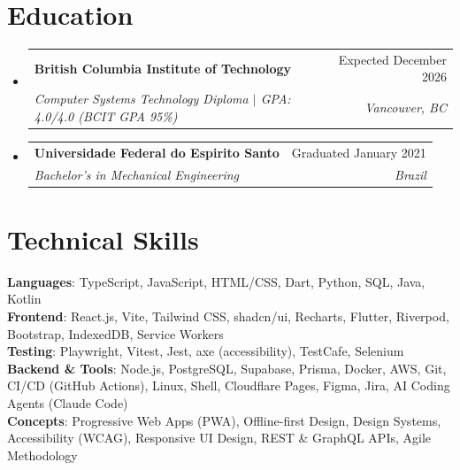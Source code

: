 \documentclass[letterpaper,11pt]{article}
\makeatletter
\newcommand{\resumeSubheading}[4]{
  \vspace{-2pt}\item
    \begin{tabular*}{0.97\textwidth}[t]{l@{\extracolsep{\fill}}r}
      \textbf{#1} & #2 \\
      \textit{\small#3} & \textit{\small #4} \\
    \end{tabular*}\vspace{-7pt}
}
\newcommand{\resumeSubHeadingListStart}{\begin{itemize}[leftmargin=0.15in, label={}]}
\newcommand{\resumeSubHeadingListEnd}{\end{itemize}}
\makeatother
\begin{document}
\section{Education}
  \resumeSubHeadingListStart
    \resumeSubheading
      {British Columbia Institute of Technology}{Expected December 2026}
      {Computer Systems Technology Diploma $|$ \textup{GPA: 4.0/4.0 (BCIT GPA 95\%)}}{Vancouver, BC}
    \resumeSubheading
      {Universidade Federal do Espirito Santo}{Graduated January 2021}
      {Bachelor's in Mechanical Engineering}{Brazil}
  \resumeSubHeadingListEnd


%
\section{Technical Skills}
 \begin{itemize}[leftmargin=0.15in, label={}]
    \small{\item{

     \textbf{Languages}{: TypeScript, JavaScript, HTML/CSS, Dart, Python, SQL, Java, Kotlin} \\

     \textbf{Frontend}{: React.js, Vite, Tailwind CSS, shadcn/ui, Recharts, Flutter, Riverpod, Bootstrap, IndexedDB, Service Workers} \\

     \textbf{Testing}{: Playwright, Vitest, Jest, axe (accessibility), TestCafe, Selenium} \\

     \textbf{Backend \& Tools}{: Node.js, PostgreSQL, Supabase, Prisma, Docker, AWS, Git, CI/CD (GitHub Actions), Linux, Shell, Cloudflare Pages, Figma, Jira, AI Coding Agents (Claude Code)} \\

     \textbf{Concepts}{: Progressive Web Apps (PWA), Offline-first Design, Design Systems, Accessibility (WCAG), Responsive UI Design, REST \& GraphQL APIs, Agile Methodology}

    }}
 \end{itemize}


\end{document}
